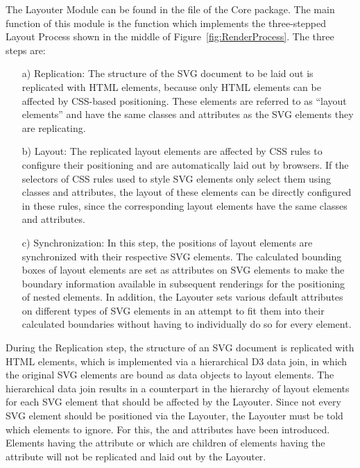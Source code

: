 The Layouter Module can be found in the  file of the
Core package. The main function of this module is the
 function which implements the three-stepped
Layout Process shown in the middle of
Figure~\ref{fig:RenderProcess}. The three steps are:
\begin{enumerate}
\item[a)] Replication: The structure of the SVG document to be laid
  out is replicated with HTML  elements, because only
  HTML elements can be affected by CSS-based positioning. These
  elements are referred to as \enquote{layout elements} and have the
  same classes and  attributes as the SVG elements
  they are replicating.

\item[b)] Layout: The replicated layout elements are affected by CSS
  rules to configure their positioning and are automatically laid out
  by browsers. If the selectors of CSS rules used to style SVG
  elements only select them using classes and 
  attributes, the layout of these elements can be directly configured
  in these rules, since the corresponding layout elements have the
  same classes and  attributes.

\item[c)] Synchronization: In this step, the positions of layout
  elements are synchronized with their respective SVG elements. The
  calculated bounding boxes of layout elements are set as
   attributes on SVG elements to make the boundary
  information available in subsequent renderings for the positioning
  of nested elements. In addition, the Layouter sets various default
  attributes on different types of SVG elements in an attempt to fit
  them into their calculated boundaries without having to individually
  do so for every element.
\end{enumerate}


During the Replication step, the structure of an SVG document is
replicated with HTML  elements, which is implemented via
a hierarchical D3 data join, in which the original SVG elements are
bound as data objects to layout elements. The hierarchical data join
results in a counterpart in the hierarchy of layout elements for each
SVG element that should be affected by the Layouter. Since
not every SVG element should be positioned via the Layouter,
the Layouter must be told which elements to ignore. For
this, the  and
 attributes have been
introduced. Elements having the 
attribute or which are children of elements having the
 attribute will not be
replicated and laid out by the Layouter.

